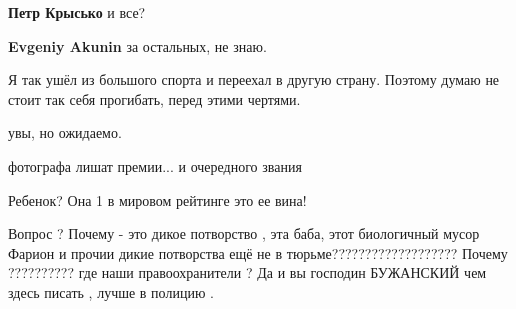 \begin{itemize}
\begin{itemize}
\textbf{Петр Крысько} и все?

 
\textbf{Evgeniy Akunin} за остальных, не знаю.
\end{itemize}

 
Я так ушёл из большого спорта и переехал в другую страну. Поэтому думаю не стоит так себя прогибать, перед этими чертями.

 
увы, но ожидаемо.

 
фотографа лишат премии... и очередного звания

 
Ребенок? Она 1 в мировом рейтинге это ее вина!

 

Вопрос ? Почему - это дикое потворство , эта баба, этот биологичный мусор
Фарион и прочии дикие потворства ещё не в тюрьме??????????????????? Почему
?????????? где наши правоохранители ? Да и вы господин БУЖАНСКИЙ чем здесь
писать , лучше в полицию .


\end{itemize}
